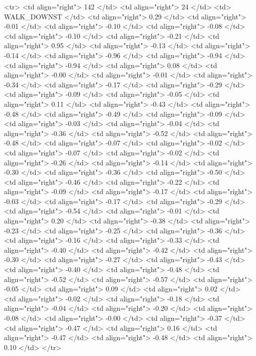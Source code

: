   <tr> <td align="right"> 142 </td> <td align="right">  24 </td> <td> WALK_DOWNST </td> <td align="right"> 0.29 </td> <td align="right"> -0.01 </td> <td align="right"> -0.10 </td> <td align="right"> -0.08 </td> <td align="right"> -0.10 </td> <td align="right"> -0.21 </td> <td align="right"> 0.95 </td> <td align="right"> -0.13 </td> <td align="right"> -0.14 </td> <td align="right"> -0.96 </td> <td align="right"> -0.94 </td> <td align="right"> -0.94 </td> <td align="right"> 0.08 </td> <td align="right"> -0.00 </td> <td align="right"> -0.01 </td> <td align="right"> -0.34 </td> <td align="right"> -0.17 </td> <td align="right"> -0.29 </td> <td align="right"> -0.09 </td> <td align="right"> -0.05 </td> <td align="right"> 0.11 </td> <td align="right"> -0.43 </td> <td align="right"> -0.48 </td> <td align="right"> -0.49 </td> <td align="right"> -0.09 </td> <td align="right"> -0.03 </td> <td align="right"> -0.04 </td> <td align="right"> -0.36 </td> <td align="right"> -0.52 </td> <td align="right"> -0.48 </td> <td align="right"> -0.07 </td> <td align="right"> -0.02 </td> <td align="right"> -0.07 </td> <td align="right"> -0.02 </td> <td align="right"> -0.26 </td> <td align="right"> -0.14 </td> <td align="right"> -0.30 </td> <td align="right"> -0.36 </td> <td align="right"> -0.50 </td> <td align="right"> -0.46 </td> <td align="right"> -0.22 </td> <td align="right"> -0.09 </td> <td align="right"> -0.17 </td> <td align="right"> -0.03 </td> <td align="right"> -0.17 </td> <td align="right"> -0.29 </td> <td align="right"> -0.54 </td> <td align="right"> -0.01 </td> <td align="right"> 0.20 </td> <td align="right"> -0.38 </td> <td align="right"> -0.23 </td> <td align="right"> -0.25 </td> <td align="right"> -0.36 </td> <td align="right"> -0.16 </td> <td align="right"> -0.33 </td> <td align="right"> -0.40 </td> <td align="right"> -0.42 </td> <td align="right"> -0.30 </td> <td align="right"> -0.27 </td> <td align="right"> -0.43 </td> <td align="right"> -0.40 </td> <td align="right"> -0.48 </td> <td align="right"> -0.52 </td> <td align="right"> -0.57 </td> <td align="right"> -0.05 </td> <td align="right"> 0.09 </td> <td align="right"> 0.02 </td> <td align="right"> -0.02 </td> <td align="right"> -0.18 </td> <td align="right"> -0.04 </td> <td align="right"> -0.20 </td> <td align="right"> -0.08 </td> <td align="right"> -0.00 </td> <td align="right"> -0.37 </td> <td align="right"> -0.47 </td> <td align="right"> 0.16 </td> <td align="right"> -0.47 </td> <td align="right"> -0.48 </td> <td align="right"> 0.10 </td> </tr>
